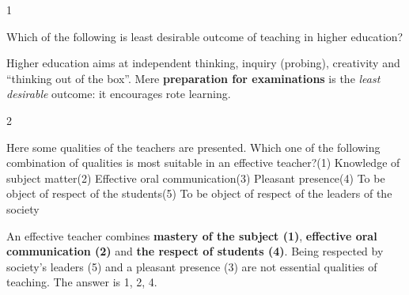 \begin{question}{1}
{Which of the following is least desirable outcome of teaching in higher education?\par}
\begin{explain}
Higher education aims at independent thinking, inquiry (probing), creativity and ``thinking out of the box''. Mere \textbf{preparation for examinations} is the \emph{least desirable} outcome: it encourages rote learning.
\end{explain}
\end{question}

\begin{question}{2}
{Here some qualities of the teachers are presented. Which one of the following combination of qualities is most suitable in an effective teacher?\newline (1) Knowledge of subject matter\newline (2) Effective oral communication\newline (3) Pleasant presence\newline (4) To be object of respect of the students\newline (5) To be object of respect of the leaders of the society\par}
\begin{explain}
An effective teacher combines \textbf{mastery of the subject (1)}, \textbf{effective oral communication (2)} and \textbf{the respect of students (4)}. Being respected by society's leaders (5) and a pleasant presence (3) are not essential qualities of teaching. The answer is 1, 2, 4.
\end{explain}
\end{question}

